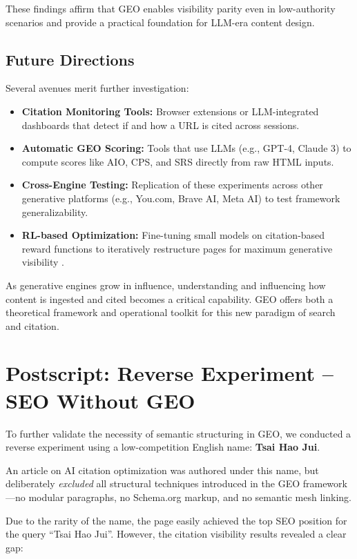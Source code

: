 These findings affirm that GEO enables visibility parity even in low-authority scenarios and provide a practical foundation for LLM-era content design.

\subsection{Future Directions}

Several avenues merit further investigation:

\begin{itemize}
  \item \textbf{Citation Monitoring Tools:} Browser extensions or LLM-integrated dashboards that detect if and how a URL is cited across sessions.
  \item \textbf{Automatic GEO Scoring:} Tools that use LLMs (e.g., GPT-4, Claude 3) to compute scores like AIO, CPS, and SRS directly from raw HTML inputs.
  \item \textbf{Cross-Engine Testing:} Replication of these experiments across other generative platforms (e.g., You.com, Brave AI, Meta AI) to test framework generalizability.
  \item \textbf{RL-based Optimization:} Fine-tuning small models on citation-based reward functions to iteratively restructure pages for maximum generative visibility \cite{luttgenau2025beyondseo}.
\end{itemize}

As generative engines grow in influence, understanding and influencing how content is ingested and cited becomes a critical capability. GEO offers both a theoretical framework and operational toolkit for this new paradigm of search and citation.

\section*{Postscript: Reverse Experiment – SEO Without GEO}

To further validate the necessity of semantic structuring in GEO, we conducted a reverse experiment using a low-competition English name: \textbf{Tsai Hao Jui}.

An article on AI citation optimization was authored under this name, but deliberately \emph{excluded} all structural techniques introduced in the GEO framework—no modular paragraphs, no Schema.org markup, and no semantic mesh linking.

Due to the rarity of the name, the page easily achieved the top SEO position for the query ``Tsai Hao Jui''. However, the citation visibility results revealed a clear gap:

